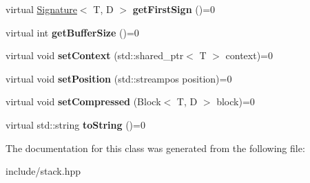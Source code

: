\begin{DoxyCompactItemize}
\item 
virtual \hyperlink{class_signature}{Signature}$<$ T, D $>$ {\bfseries get\+First\+Sign} ()=0\hypertarget{class_stack_ad270abee82575fc6644b84381c0d77b8}{}\label{class_stack_ad270abee82575fc6644b84381c0d77b8}

\item 
virtual int {\bfseries get\+Buffer\+Size} ()=0\hypertarget{class_stack_ab9758df4a9908c9ab2e55ada2adeed44}{}\label{class_stack_ab9758df4a9908c9ab2e55ada2adeed44}

\item 
virtual void {\bfseries set\+Context} (std\+::shared\+\_\+ptr$<$ T $>$ context)=0\hypertarget{class_stack_a115dceb34061f3f85a9690487105e0d4}{}\label{class_stack_a115dceb34061f3f85a9690487105e0d4}

\item 
virtual void {\bfseries set\+Position} (std\+::streampos position)=0\hypertarget{class_stack_a709f0cda4f86650dc32b5dfbd732631b}{}\label{class_stack_a709f0cda4f86650dc32b5dfbd732631b}

\item 
virtual void {\bfseries set\+Compressed} (Block$<$ T, D $>$ block)=0\hypertarget{class_stack_aad51cfcdcabb79dd0ca3af419b482ecd}{}\label{class_stack_aad51cfcdcabb79dd0ca3af419b482ecd}

\item 
virtual std\+::string {\bfseries to\+String} ()=0\hypertarget{class_stack_a0fd2d1fca9cf1909ee73e930150f753d}{}\label{class_stack_a0fd2d1fca9cf1909ee73e930150f753d}

\end{DoxyCompactItemize}


The documentation for this class was generated from the following file\+:\begin{DoxyCompactItemize}
\item 
include/stack.\+hpp\end{DoxyCompactItemize}
